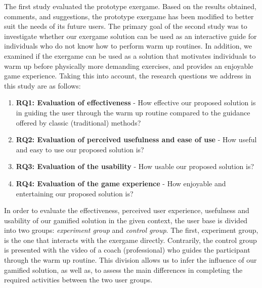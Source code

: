 The first study evaluated the prototype exergame. Based on the results obtained, comments, and suggestions, the prototype exergame has been modified to better suit the needs of its future users. The primary goal of the second study was to investigate whether our exergame solution can be used as an interactive guide for individuals who do not know how to perform warm up routines. In addition, we examined if the exergame can be used as a solution that motivates individuals to warm up before physically more demanding exercises, and provides an enjoyable game experience. Taking this into account, the research questions we address in this study are as follows: 
\begin{enumerate}
\item \textbf{RQ1: Evaluation of effectiveness} - How effective our proposed solution is in guiding the user through the warm up routine compared to the guidance offered by classic (traditional) methods?
\item \textbf{RQ2: Evaluation of perceived usefulness and ease of use} - How useful and easy to use our proposed solution is?
\item \textbf{RQ3: Evaluation of the usability} - How usable our proposed solution is? 
\item \textbf{RQ4: Evaluation of the game experience} - How enjoyable and entertaining our proposed solution is? 
\end{enumerate}
In order to evaluate the effectiveness, perceived user experience, usefulness and usability of our gamified solution in the given context, the user base is divided into two groups: \textit{experiment group} and \textit{control group}. The first, experiment group, is the one that interacts with the exergame directly. Contrarily, the control group is presented with the video of a coach (professional) who guides the participant through the warm up routine. This division allows us to infer the influence of our gamified solution, as well as, to assess the main differences in completing the required activities between the two user groups. 
